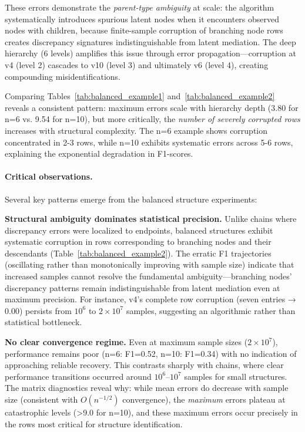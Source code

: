 \documentclass[11pt,a4paper]{article}
\numberwithin{equation}{section}
\begin{document}
These errors demonstrate the \emph{parent-type ambiguity} at scale: the algorithm systematically introduces spurious latent nodes when it encounters observed nodes with children, because finite-sample corruption of branching node rows creates discrepancy signatures indistinguishable from latent mediation. The deep hierarchy (6 levels) amplifies this issue through error propagation—corruption at v4 (level 2) cascades to v10 (level 3) and ultimately v6 (level 4), creating compounding misidentifications.

Comparing Tables~\ref{tab:balanced_example1} and~\ref{tab:balanced_example2} reveals a consistent pattern: maximum errors scale with hierarchy depth (3.80 for n=6 vs. 9.54 for n=10), but more critically, the \emph{number of severely corrupted rows} increases with structural complexity. The n=6 example shows corruption concentrated in 2-3 rows, while n=10 exhibits systematic errors across 5-6 rows, explaining the exponential degradation in F1-scores.

\paragraph{Critical observations.} Several key patterns emerge from the balanced structure experiments:

\textbf{Structural ambiguity dominates statistical precision.} Unlike chains where discrepancy errors were localized to endpoints, balanced structures exhibit systematic corruption in rows corresponding to branching nodes and their descendants (Table~\ref{tab:balanced_example2}). The erratic F1 trajectories (oscillating rather than monotonically improving with sample size) indicate that increased samples cannot resolve the fundamental ambiguity—branching nodes' discrepancy patterns remain indistinguishable from latent mediation even at maximum precision. For instance, v4's complete row corruption (seven entries → 0.00) persists from $10^6$ to $2 \times 10^7$ samples, suggesting an algorithmic rather than statistical bottleneck.

\textbf{No clear convergence regime.} Even at maximum sample sizes ($2 \times 10^7$), performance remains poor (n=6: F1=0.52, n=10: F1=0.34) with no indication of approaching reliable recovery. This contrasts sharply with chains, where clear performance transitions occurred around $10^6$--$10^7$ samples for small structures. The matrix diagnostics reveal why: while mean errors do decrease with sample size (consistent with $O(n^{-1/2})$ convergence), the \emph{maximum} errors plateau at catastrophic levels (>9.0 for n=10), and these maximum errors occur precisely in the rows most critical for structure identification.
\end{document}
